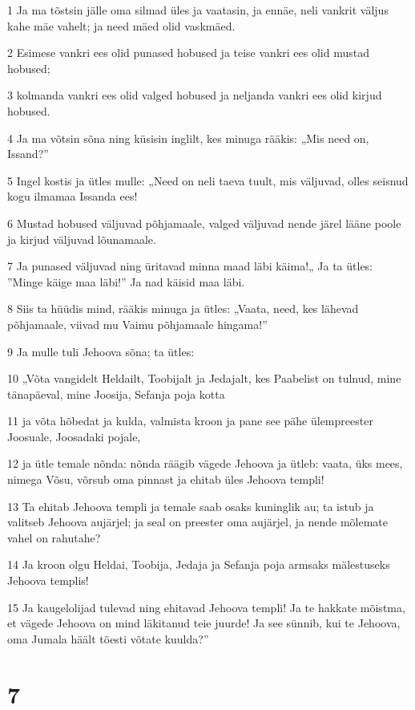\par 1 Ja ma tõstsin jälle oma silmad üles ja vaatasin, ja ennäe, neli vankrit väljus kahe mäe vahelt; ja need mäed olid vaskmäed.
\par 2 Esimese vankri ees olid punased hobused ja teise vankri ees olid mustad hobused;
\par 3 kolmanda vankri ees olid valged hobused ja neljanda vankri ees olid kirjud hobused.
\par 4 Ja ma võtsin sõna ning küsisin inglilt, kes minuga rääkis: „Mis need on, Issand?”
\par 5 Ingel kostis ja ütles mulle: „Need on neli taeva tuult, mis väljuvad, olles seisnud kogu ilmamaa Issanda ees!
\par 6 Mustad hobused väljuvad põhjamaale, valged väljuvad nende järel lääne poole ja kirjud väljuvad lõunamaale.
\par 7 Ja punased väljuvad ning üritavad minna maad läbi käima!„ Ja ta ütles: ”Minge käige maa läbi!” Ja nad käisid maa läbi.
\par 8 Siis ta hüüdis mind, rääkis minuga ja ütles: „Vaata, need, kes lähevad põhjamaale, viivad mu Vaimu põhjamaale hingama!”
\par 9 Ja mulle tuli Jehoova sõna; ta ütles:
\par 10 „Võta vangidelt Heldailt, Toobijalt ja Jedajalt, kes Paabelist on tulnud, mine tänapäeval, mine Joosija, Sefanja poja kotta
\par 11 ja võta hõbedat ja kulda, valmista kroon ja pane see pähe ülempreester Joosuale, Joosadaki pojale,
\par 12 ja ütle temale nõnda: nõnda räägib vägede Jehoova ja ütleb: vaata, üks mees, nimega Võsu, võrsub oma pinnast ja ehitab üles Jehoova templi!
\par 13 Ta ehitab Jehoova templi ja temale saab osaks kuninglik au; ta istub ja valitseb Jehoova aujärjel; ja seal on preester oma aujärjel, ja nende mõlemate vahel on rahutahe?
\par 14 Ja kroon olgu Heldai, Toobija, Jedaja ja Sefanja poja armsaks mälestuseks Jehoova templis!
\par 15 Ja kaugelolijad tulevad ning ehitavad Jehoova templi! Ja te hakkate mõistma, et vägede Jehoova on mind läkitanud teie juurde! Ja see sünnib, kui te Jehoova, oma Jumala häält tõesti võtate kuulda?”


\chapter{7}

